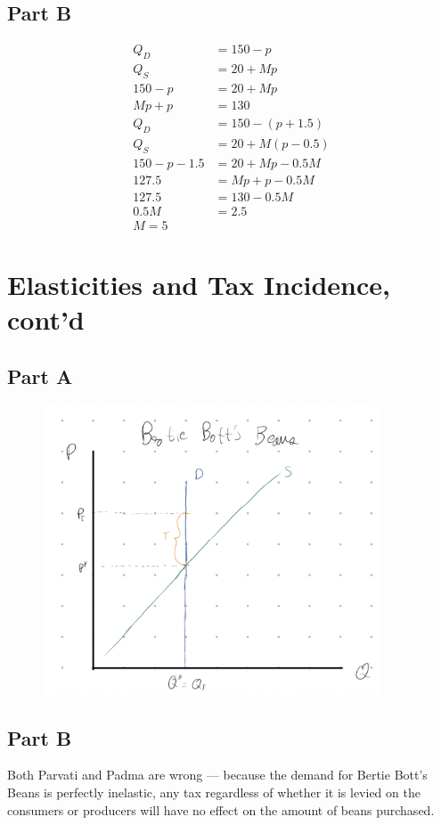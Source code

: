 \documentclass[8pt]{extarticle}
\begin{document}
{\subsection*{Part B}
\begin{align*}
	Q_D &= 150 - p\\
	Q_S &= 20 + Mp\\
	150-p &= 20 + Mp\\
	Mp+p &= 130\\
	Q_D &= 150 - (p+1.5)\\
	Q_S &= 20 + M(p-0.5)\\
	150 - p - 1.5 &= 20 + Mp - 0.5M\\
	127.5 &= Mp+p-0.5M\\
	127.5 &= 130 - 0.5M\\
	0.5M &= 2.5\\
	M = \boxed{5}
\end{align*}
\pagebreak
\section*{Elasticities and Tax Incidence, cont'd}
\subsection*{Part A}
\begin{figure}[h]
	\centering
	\includegraphics[width=10cm]{HW2Q8A}
\end{figure}
\subsection*{Part B}
Both Parvati and Padma are wrong — because the demand for Bertie Bott's Beans is perfectly inelastic, any tax regardless of whether it is levied on the consumers or producers will have no effect on the amount of beans purchased.
}
\end{document}
